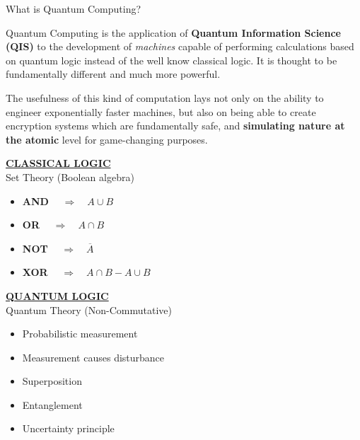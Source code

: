 \documentclass[9pt, handout, aspectratio=169]{beamer}		%
\begin{document}
	\begin{frame}{What is Quantum Computing?}
		
		Quantum Computing is the application of \textbf{Quantum Information Science (QIS)} to the development of \textit{machines} capable of performing calculations based on quantum logic instead of the well know classical logic. It is thought to be fundamentally different and much more powerful. 
		
		\medskip
		
		The usefulness of this kind of computation lays not only on the ability to engineer exponentially faster machines, but also on being able to create encryption systems which are fundamentally safe, and \textbf{simulating nature at the atomic} level for game-changing purposes.

		\begin{multicols}{2}
		
			\underline{\textbf{CLASSICAL LOGIC}}\\
			Set Theory (Boolean algebra)
			
			\medskip
			
			\begin{itemize}
				\item \textbf{AND} $\quad \Rightarrow \quad A \cup B$
				\item \textbf{OR} $\quad \Rightarrow \quad A \cap B$
				\item \textbf{NOT} $\quad \Rightarrow \quad \overline{A}$
				\item \textbf{XOR} $ \quad \Rightarrow \quad A \cap B - A \cup B$
			\end{itemize}
		
			\columnbreak
			
			\underline{\textbf{	QUANTUM LOGIC}}\\
			Quantum Theory (Non-Commutative)
			
			\medskip
						
			\begin{itemize}
				\item Probabilistic measurement
				\item Measurement causes disturbance
				\item Superposition
				\item Entanglement
				\item Uncertainty principle
			\end{itemize}
		
		\end{multicols}
		
	\end{frame}
	
\end{document}
